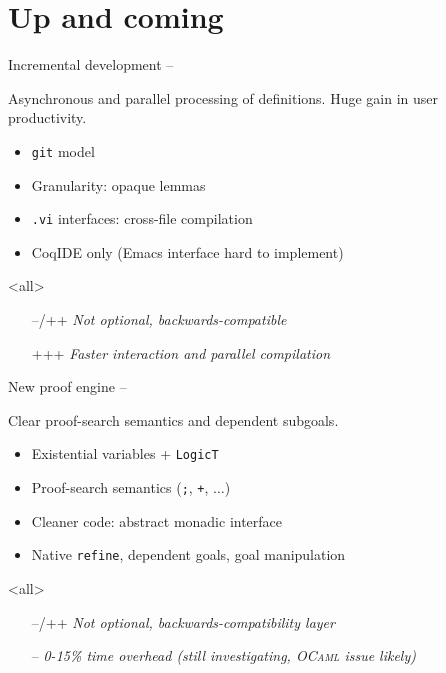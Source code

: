 
\section{Up and coming}


\begin{subsecframe}{Incremental development -- }
  \begin{center}
    Asynchronous and parallel processing of definitions.    
    Huge gain in user productivity.
  \end{center}

  \begin{itemize}
  \item \texttt{git} model
  \item Granularity: opaque lemmas
  \item \texttt{.vi} interfaces: cross-file compilation
  \item CoqIDE only (Emacs interface hard to implement)
  \end{itemize}
  \mode<all>

  \begin{itemize}
  \item[--/++] \emph{Not optional, backwards-compatible}
  \item[+++] \emph{Faster interaction and parallel compilation}
  \end{itemize}
\end{subsecframe}


\begin{subsecframe}{New proof engine -- }
  \begin{center}
    Clear proof-search semantics and dependent subgoals.
  \end{center}
  
  \begin{itemize}
  \item Existential variables + \texttt{LogicT}
  \item Proof-search semantics (\texttt{;}, \texttt{+}, $\ldots$)
  \item Cleaner code: abstract monadic interface
  \item Native \texttt{refine}, dependent goals, goal manipulation
  \end{itemize}
  \mode<all>

  \begin{itemize}
  \item[--/++] \emph{Not optional, backwards-compatibility layer}
  \item[--] \emph{0-15\% time overhead (still investigating, \textsc{OCaml} issue likely)}
  \end{itemize}
\end{subsecframe}


